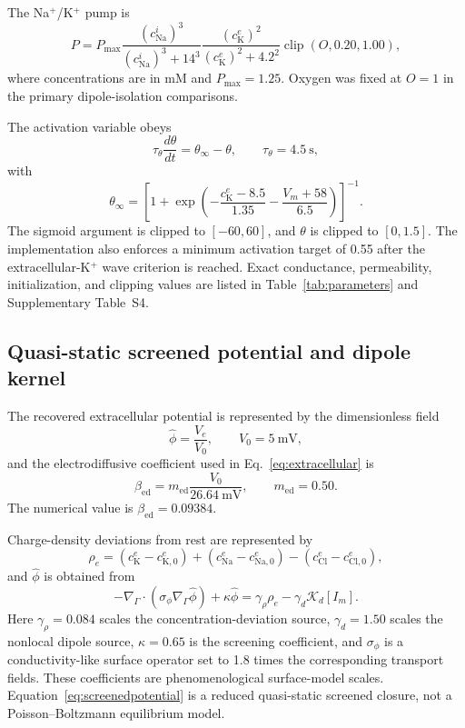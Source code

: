 \documentclass[12pt]{article}
\begin{document}
The Na$^+$/K$^+$ pump is
\begin{equation}
P=P_{\max}
\frac{(c_{\mathrm{Na}}^{i})^3}{(c_{\mathrm{Na}}^{i})^3+14^3}
\frac{(c_{\mathrm K}^{e})^2}{(c_{\mathrm K}^{e})^2+4.2^2}
\operatorname{clip}(O,0.20,1.00),
\label{eq:pump}
\end{equation}
where concentrations are in mM and $P_{\max}=1.25$. Oxygen was fixed at $O=1$ in the primary dipole-isolation comparisons.

The activation variable obeys
\begin{equation}
\tau_{\theta}\frac{d\theta}{dt}=\theta_{\infty}-\theta,
\qquad \tau_{\theta}=4.5\ \mathrm{s},
\end{equation}
with
\begin{equation}
\theta_{\infty}=\left[1+\exp\!\left(-\frac{c_{\mathrm K}^{e}-8.5}{1.35}-\frac{V_m+58}{6.5}\right)\right]^{-1}.
\end{equation}
The sigmoid argument is clipped to $[-60,60]$, and $\theta$ is clipped to $[0,1.5]$. The implementation also enforces a minimum activation target of 0.55 after the extracellular-K$^+$ wave criterion is reached. Exact conductance, permeability, initialization, and clipping values are listed in Table~\ref{tab:parameters} and Supplementary Table~S4.

\subsection{Quasi-static screened potential and dipole kernel}

The recovered extracellular potential is represented by the dimensionless field
\begin{equation}
\hat{\phi}=\frac{V_e}{V_0},
\qquad V_0=5\ \mathrm{mV},
\end{equation}
and the electrodiffusive coefficient used in Eq.~\eqref{eq:extracellular} is
\begin{equation}
\beta_{\mathrm{ed}}=m_{\mathrm{ed}}\frac{V_0}{26.64\ \mathrm{mV}},
\qquad m_{\mathrm{ed}}=0.50.
\end{equation}
The numerical value is $\beta_{\mathrm{ed}}=0.09384$.

Charge-density deviations from rest are represented by
\begin{equation}
\rho_e=(c_{\mathrm K}^{e}-c_{\mathrm K,0}^{e})
+(c_{\mathrm{Na}}^{e}-c_{\mathrm{Na},0}^{e})
-(c_{\mathrm{Cl}}^{e}-c_{\mathrm{Cl},0}^{e}),
\end{equation}
and $\hat\phi$ is obtained from
\begin{equation}
-\nabla_{\Gamma}\cdot(\sigma_{\phi}\nabla_{\Gamma}\hat{\phi})
+\kappa\hat{\phi}
=\gamma_{\rho}\rho_e-\gamma_d\mathcal K_d[I_m].
\label{eq:screenedpotential}
\end{equation}
Here $\gamma_{\rho}=0.084$ scales the concentration-deviation source, $\gamma_d=1.50$ scales the nonlocal dipole source, $\kappa=0.65$ is the screening coefficient, and $\sigma_{\phi}$ is a conductivity-like surface operator set to 1.8 times the corresponding transport fields. These coefficients are phenomenological surface-model scales. Equation~\eqref{eq:screenedpotential} is a reduced quasi-static screened closure, not a Poisson--Boltzmann equilibrium model.
\end{document}
